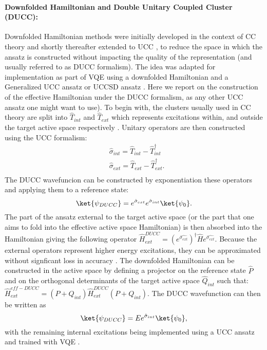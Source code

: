 \paragraph{Downfolded Hamiltonian and Double Unitary Coupled Cluster (DUCC):} Downfolded Hamiltonian methods were initially developed in the context of CC theory and shortly thereafter extended to UCC \cite{Kowalski2018, Bauman2019, Bauman2019_2, Kowalski2020, Kowalski2021}, to reduce the space in which the ansatz is constructed without impacting the quality of the representation (and usually referred to as DUCC formalism). The idea was adapted for implementation as part of VQE using a downfolded Hamiltonian and a Generalized UCC ansatz \cite{Bauman2021} or UCCSD ansatz \cite{Metcalf2020}. Here we report on the construction of the effective Hamiltonian under the DUCC formalism, as any other UCC ansatz one might want to use). To begin with, the clusters usually used in CC theory are split into $\hat{T}_{int}$ and $\hat{T}_{ext}$ which represents excitations within, and outside the target active space respectively \cite{Bauman2019, Bauman2019_2}. Unitary operators are then constructed using the UCC formalism:
\begin{equation}
    \begin{aligned}
        &\hat{\sigma}_{int} = \hat{T}_{int} - \hat{T}^{\dagger}_{int} \\
        &\hat{\sigma}_{ext} = \hat{T}_{ext} - \hat{T}^{\dagger}_{ext}. \\
    \end{aligned}
\end{equation}
The DUCC wavefuncion can be constructed by exponentiation these operators and applying them to a reference state:
\begin{equation}
    \ket{\psi_{DUCC}} = e^{\hat{\sigma}_{ext}}e^{\hat{\sigma}_{int}}\ket{\psi_0}.
\end{equation}
The part of the ansatz external to the  target active space (or the part that one aims to fold into the effective active space Hamiltonian) is then absorbed into the Hamiltonian giving the following operator $\hat{H}_{ext}^{DUCC} = (e^{\hat{\sigma_{ext}}})^{\dagger} \hat{H}e^{\hat{\sigma_{ext}}}$. Because the external operators represent higher energy excitations, they can be approximated without signficant loss in accuracy \cite{Metcalf2020, Bauman2019}. The downfolded Hamiltonian can be constructed in the active space by defining a projector on the reference state $\hat{P}$ and on the orthogonal determinants of the target active space $\hat{Q}_{int}$ such that: $\hat{H}_{ext}^{eff-DUCC} = (P + Q_{int})\hat{H}_{ext}^{DUCC}(P + Q_{int})$. The DUCC wavefunction can then be written as
\begin{equation}
    \ket{\psi_{DUCC}} = Ee^{\hat{\sigma}_{int}}\ket{\psi_0},
\end{equation}
with the remaining internal excitations being implemented using a UCC ansatz and trained with VQE \cite{Metcalf2020, Bauman2021}. 

